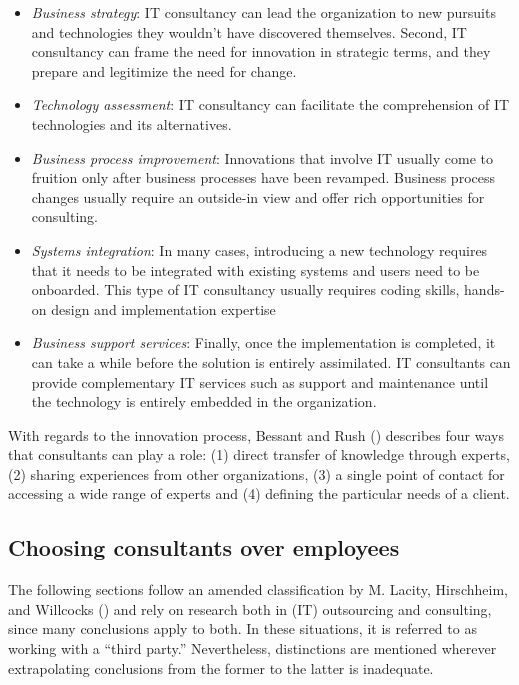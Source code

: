 \documentclass[
  man,floatsintext]{apa6}
\providecommand{\tightlist}{%
  \setlength{\itemsep}{0pt}\setlength{\parskip}{0pt}}
\begin{document}
\begin{itemize}
\tightlist
\item
  \emph{Business strategy}: IT consultancy can lead the organization to new pursuits and technologies they wouldn't have discovered themselves. Second, IT consultancy can frame the need for innovation in strategic terms, and they prepare and legitimize the need for change.
\item
  \emph{Technology assessment}: IT consultancy can facilitate the comprehension of IT technologies and its alternatives.
\item
  \emph{Business process improvement}: Innovations that involve IT usually come to fruition only after business processes have been revamped. Business process changes usually require an outside-in view and offer rich opportunities for consulting.
\item
  \emph{Systems integration}: In many cases, introducing a new technology requires that it needs to be integrated with existing systems and users need to be onboarded. This type of IT consultancy usually requires coding skills, hands-on design and implementation expertise
\item
  \emph{Business support services}: Finally, once the implementation is completed, it can take a while before the solution is entirely assimilated. IT consultants can provide complementary IT services such as support and maintenance until the technology is entirely embedded in the organization.
\end{itemize}

With regards to the innovation process, Bessant and Rush () describes four ways that consultants can play a role: (1) direct transfer of knowledge through experts, (2) sharing experiences from other organizations, (3) a single point of contact for accessing a wide range of experts and (4) defining the particular needs of a client.

\subsection{Choosing consultants over employees}\label{choosing-consultants-over-employees}

The following sections follow an amended classification by M. Lacity, Hirschheim, and Willcocks () and rely on research both in (IT) outsourcing and consulting, since many conclusions apply to both. In these situations, it is referred to as working with a ``third party.'' Nevertheless, distinctions are mentioned wherever extrapolating conclusions from the former to the latter is inadequate.
\end{document}
